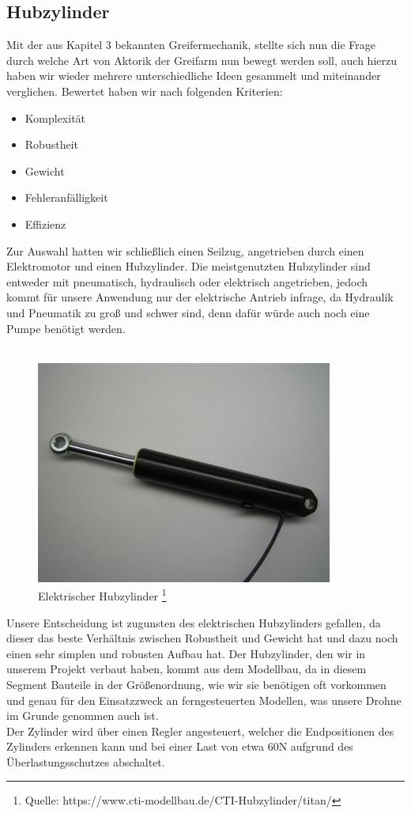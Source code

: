 \subsection{Hubzylinder}
Mit der aus Kapitel 3 bekannten Greifermechanik, stellte sich nun die Frage durch welche Art von Aktorik der Greifarm nun bewegt werden soll, auch hierzu haben wir wieder mehrere unterschiedliche Ideen gesammelt und miteinander verglichen. Bewertet haben wir nach folgenden Kriterien:
\begin{itemize}
	\item Komplexität
	\item Robustheit
	\item Gewicht
	\item Fehleranfälligkeit
	\item Effizienz
\end{itemize}
Zur Auswahl hatten wir schließlich einen Seilzug, angetrieben durch einen Elektromotor und einen Hubzylinder. Die meistgenutzten Hubzylinder sind entweder mit pneumatisch, hydraulisch oder elektrisch angetrieben, jedoch kommt für unsere Anwendung nur der elektrische Antrieb infrage, da Hydraulik und Pneumatik zu groß und schwer sind, denn dafür würde auch noch eine Pumpe benötigt werden.\\
\\
\newpage
\begin{figure}[h]
	\centering
	\includegraphics[scale=0.8]{"Grafiken/Hubzylinder.jpg"}
	\caption{Elektrischer Hubzylinder \footnote{Quelle: https://www.cti-modellbau.de/CTI-Hubzylinder/titan/}}
	\label{fig:hubzylinder}
\end{figure}
Unsere Entscheidung ist zugunsten des elektrischen Hubzylinders gefallen, da dieser das beste Verhältnis zwischen Robustheit und Gewicht hat und dazu noch einen sehr simplen und robusten Aufbau hat. Der Hubzylinder, den wir in unserem Projekt verbaut haben, kommt aus dem Modellbau, da in diesem Segment Bauteile in der Größenordnung, wie wir sie benötigen oft vorkommen und genau für den Einsatzzweck an ferngesteuerten Modellen, was unsere Drohne im Grunde genommen auch ist.\\
Der Zylinder wird über einen Regler angesteuert, welcher die Endpositionen des Zylinders erkennen kann und bei einer Last von etwa 60N aufgrund des Überlastungsschutzes abschaltet.

